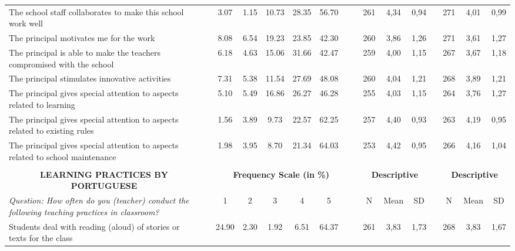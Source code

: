 \documentclass[a4paper, 12pt]{article}
\begin{document}
\begin{landscape}
\begin{table}[htbp]
\begin{adjustbox}{width=10.5in,totalheight=6in}
\begin{tabular}{llcccccccccccccc}
    The school staff collaborates to make this school work well &       & 3.07  & 1.15  & 10.73 & 28.35 & 56.70 &       &       & 261   & 4,34  & 0,94  &       & 271   & 4,01  & 0,99 \\
    The principal motivates me for the work &       & 8.08  & 6.54  & 19.23 & 23.85 & 42.30 &       &       & 260   & 3,86  & 1,26  &       & 271   & 3,61  & 1,27 \\
    The principal is able to make the teachers compromised with the school &       & 6.18  & 4.63  & 15.06 & 31.66 & 42.47 &       &       & 259   & 4,00  & 1,15  &       & 267   & 3,67  & 1,18 \\
    The principal stimulates innovative activities &       & 7.31  & 5.38  & 11.54 & 27.69 & 48.08 &       &       & 260   & 4,04  & 1,21  &       & 268   & 3,89  & 1,21 \\
    The principal gives special attention to aspects related to learning &       & 5.10  & 5.49  & 16.86 & 26.27 & 46.28 &       &       & 255   & 4,03  & 1,15  &       & 264   & 3,76  & 1,27 \\
    The principal gives special attention to aspects related to existing rules &       & 1.56  & 3.89  & 9.73  & 22.57 & 62.25 &       &       & 257   & 4,40  & 0,93  &       & 263   & 4,19  & 0,95 \\
    The principal gives special attention to aspects related to school maintenance &       & 1.98  & 3.95  & 8.70  & 21.34 & 64.03 &       &       & 253   & 4,42  & 0,95  &       & 266   & 4,16  & 1,04 \\
          &       &       &       &       &       &       &       &       &       &       &       &       &       &       &  \\
    \multicolumn{1}{c}{\textbf{LEARNING PRACTICES BY PORTUGUESE}} &       & \multicolumn{6}{c}{\textbf{Frequency Scale (in \%)}} &       & \multicolumn{3}{c}{\textbf{Descriptive}} &       & \multicolumn{3}{c}{\textbf{Descriptive}} \\
\cmidrule{1-1}\cmidrule{3-7}\cmidrule{10-12}\cmidrule{14-16}    \textit{Question: How often do you (teacher) conduct the following teaching practices in classroom?} &       & 1     & 2     & 3     & 4     & 5     &       &       & N     & Mean  & SD    &       & N     & Mean  & SD \\
\cmidrule{1-1}\cmidrule{3-7}\cmidrule{10-12}\cmidrule{14-16}    Students deal with reading (aloud) of stories or texts for the class &       & 24.90 & 2.30  & 1.92  & 6.51  & 64.37 &       &       & 261   & 3,83  & 1,73  &       & 268   & 3,83  & 1,67 \\

\end{tabular}
\end{adjustbox}
\end{table}
\end{landscape}
\end{document}
